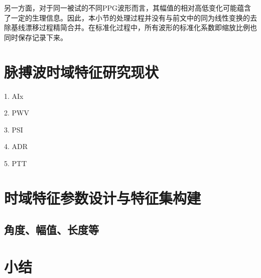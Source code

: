另一方面，对于同一被试的不同PPG波形而言，其幅值的相对高低变化可能蕴含了一定的生理信息。因此，本小节的处理过程并没有与前文中的同为线性变换的去除基线漂移过程精简合并。在标准化过程中，所有波形的标准化系数即缩放比例也同时保存记录下来。
\section{脉搏波时域特征研究现状}
1. AIx

2. PWV

3. PSI

4. ADR

5. PTT

\section{时域特征参数设计与特征集构建}
\subsection{角度、幅值、长度等}
\section{小结}